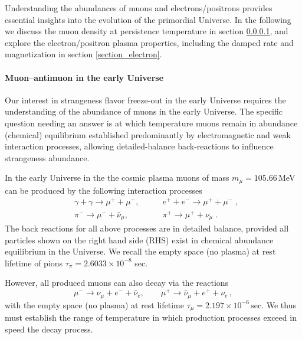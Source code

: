 Understanding the abundances of muons and electrons/positrons provides essential insights into the evolution of the primordial Universe.  In the following we discuss the muon density at persistence temperature in section \ref{section_muon}, and explore the electron/positron plasma properties, including the damped rate and magnetization in section \ref{section_electron}.

\paragraph{Muon–antimuon in the early Universe}\label{section_muon}

Our interest in strangeness flavor freeze-out in the early Universe requires the understanding of the abundance of muons in the early Universe. The specific question needing an answer is at which temperature muons remain in abundance (chemical) equilibrium established predominantly by electromagnetic and weak interaction processes, allowing detailed-balance back-reactions to influence strangeness abundance.

In the early Universe in the the cosmic plasma muons of mass $m_\mu=105.66$\,MeV can be produced by the following interaction processes
\begin{align} 
&\gamma+\gamma\longrightarrow\mu^++\mu^-,\qquad & e^++e^-\longrightarrow \mu^++\mu^-\;,\\
&\pi^-\longrightarrow\mu^-+\bar{\nu}_\mu,\qquad & \pi^+\longrightarrow\mu^++\nu_\mu\;.
\end{align}
The back reactions for all above processes are in detailed balance, provided all particles shown on the right hand side (RHS) exist in chemical abundance equilibrium in the Universe. We recall the empty space (no plasma) at rest lifetime of pions $\tau_\pi=2.6033\times10^{-8}$ sec. 

However, all produced muons can also decay via the reactions
\begin{equation}
\mu^-\rightarrow\nu_\mu+e^-+\bar{\nu}_e,\qquad \mu^+\rightarrow\bar{\nu}_\mu+e^++\nu_e\,,
\end{equation} 
with the empty space (no plasma) at rest lifetime $\tau_{\mu}=2.197 \times 10^{-6}\,\mathrm{sec}$. We thus must establish the range of temperature in which production processes exceed in speed the decay process.
 
